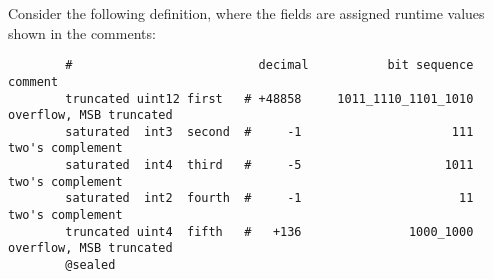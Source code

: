 \begin{remark}
    Consider the following definition,
    where the fields are assigned runtime values shown in the comments:

    \begin{verbatim}
        #                          decimal           bit sequence   comment
        truncated uint12 first   # +48858     1011_1110_1101_1010   overflow, MSB truncated
        saturated  int3  second  #     -1                     111   two's complement
        saturated  int4  third   #     -5                    1011   two's complement
        saturated  int2  fourth  #     -1                      11   two's complement
        truncated uint4  fifth   #   +136               1000_1000   overflow, MSB truncated
        @sealed
    \end{verbatim}


\end{remark}
